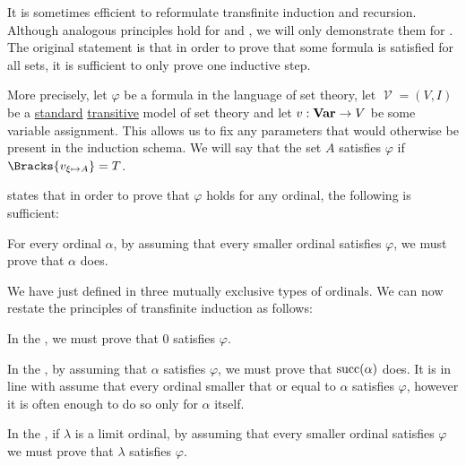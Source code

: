 \begin{remark}\label{rem:transfinite_induction}
  It is sometimes efficient to reformulate transfinite induction and recursion. Although analogous principles hold for  and , we will only demonstrate them for . The original statement is that in order to prove that some formula is satisfied for all sets, it is sufficient to only prove one inductive step.

  More precisely, let \( \varphi \) be a formula in the language of set theory, let \( \mscrV = (V, I) \) be a \hyperref[rem:standard_model_of_set_theory]{standard} \hyperref[rem:transitive_model_of_set_theory]{transitive} model of set theory and let \( v: \operatorname{\mathbf{Var}} \to V \) be some variable assignment. This allows us to fix any parameters that would otherwise be present in the induction schema. We will say that the set \( A \) satisfies \( \varphi \) if \( \Bracks{v_{\xi \mapsto A}} = T \).

   states that in order to prove that \( \varphi \) holds for any ordinal, the following is sufficient:
  \begin{thmenum}[series=rem:transfinite_induction]
     For every ordinal \( \alpha \), by assuming that every smaller ordinal satisfies \( \varphi \), we must prove that \( \alpha \) does.
  \end{thmenum}

  We have just defined in  three mutually exclusive types of ordinals. We can now restate the principles of transfinite induction as follows:
  \begin{thmenum}[resume=rem:transfinite_induction]
     In the , we must prove that \( 0 \) satisfies \( \varphi \).

     In the , by assuming that \( \alpha \) satisfies \( \varphi \), we must prove that \( \operatorname{succ}(\alpha) \) does. It is in line with  assume that every ordinal smaller that or equal to \( \alpha \) satisfies \( \varphi \), however it is often enough to do so only for \( \alpha \) itself.

     In the , if \( \lambda \) is a limit ordinal, by assuming that every smaller ordinal satisfies \( \varphi \) we must prove that \( \lambda \) satisfies \( \varphi \).
  \end{thmenum}


\end{remark}
